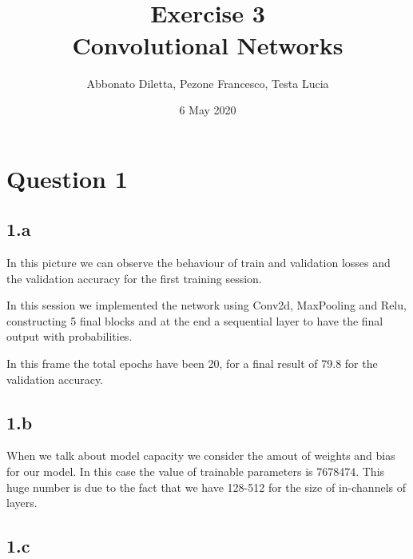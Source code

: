 \documentclass{article}
\title{\BIG{Advanced Machine Learning} \\
Exercise 3 \\   Convolutional Networks}
\author{Abbonato Diletta, Pezone Francesco, Testa Lucia}
\date{6 May 2020}
\begin{document}
\maketitle

\section{Question 1}

\subsection*{1.a}

\begin{figure}[!h]
	\begin{center}
		\hspace{1mm}
	\end{center}
	\captionsetup{justification=raggedright,margin=1cm}
	\label{gr}
\end{figure}

In this picture we can observe the behaviour of train and validation losses and the validation accuracy for the first training session. 

In this session we implemented the network using Conv2d, MaxPooling and Relu, constructing 5 final blocks and at the end a sequential layer to have the final output with probabilities. 

In this frame the total epochs have been 20, for a final result of 79.8 for the validation accuracy. 

 

\subsection*{1.b}

When we talk about model capacity we consider the amout of weights and bias for our model. 
In this case the value of trainable parameters is 7678474.
This huge number is due to the fact that we have 128-512 for the size of in-channels of layers.




\newpage
\subsection*{1.c}
\end{document}
